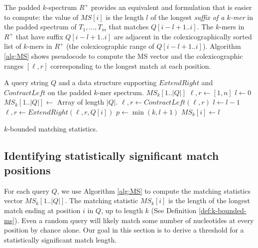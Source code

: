 \documentclass[unnumsec,webpdf,contemporary,large]{oup-authoring-template}%
\theoremstyle{thmstyleone}%
\theoremstyle{thmstyletwo}%
\theoremstyle{thmstylethree}%
\begin{document}
The padded $k$-spectrum $R^+$ provides an equivalent and formulation that is easier to compute: the value of $MS[i]$ is the length $l$ of the longest \emph{suffix of a $k$-mer} in the padded spectrum of $T_1, \ldots, T_m$ that matches $Q[i-l+1..i]$. The $k$-mers in $R^+$ that have suffix $Q[i-l+1..i]$ are adjacent in the colexicographically sorted list of $k$-mers in $R^+$ (the colexicographic range of $Q[i-l+1..i]$). Algorithm \ref{alg:MS} shows pseudocode to compute the MS vector and the colexicographic ranges $[\ell, r]$ corresponding to the longest match at each position.

\begin{algorithm}
\begin{algorithmic}[1]
\small
\Require A query string $Q$ and a data structure supporting $ExtendRight$ and $ContractLeft$ on the padded $k$-mer spectrum. %
\Ensure $MS_k[1..|Q|]$
\State $\ell, r \gets [1,n]$ 
\State $l \gets 0$ 
\State $MS_k[1..|Q|] \gets $ Array of length $|Q|$.
\label{line:MS-1-start}
    \State $\ell, r \gets ContractLeft(\ell, r)$
    \State $l \gets l-1$
\EndWhile \label{line:MS-1-end}
    \State $\ell, r \gets ExtendRight(\ell, r, Q[i])$\label{line:MS-2-start}
    \State $p \gets \min(k, l+1)$\label{line:MS-2-end}
\EndIf
\State $MS_k[i] \gets l$ %
\label{line:MS-4-assignment}
\EndFor
\caption{\small $k$-bounded matching statistics.} 
\label{alg:MS}
\end{algorithmic}
\end{algorithm}

\subsection{Identifying statistically significant match positions}\label{sec:random-match-model}
For each query $Q$, we use Algorithm \ref{alg:MS} to compute the matching statistics vector $MS_k[1..|Q|]$. The matching statistic $MS_k[i]$ is the length of the longest match ending at position $i$ in $Q$, up to length $k$ (See Definition \ref{def:k-bounded-ms}). Even a random query will likely match some number of nucleotides at every position by chance alone. Our goal in this section is to derive a threshold for a statistically significant match length.
\end{document}
